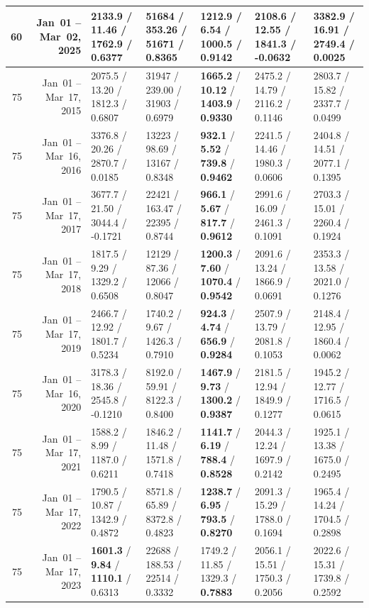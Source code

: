 \begin{longtable}{r r l l l l l}
60 & Jan~01 -- Mar~02, 2025 & 2133.9 / 11.46 / 1762.9 / 0.6377 & 51684 / 353.26 / 51671 / 0.8365 & \textbf{1212.9} / \textbf{6.54} / \textbf{1000.5} / \textbf{0.9142} & 2108.6 / 12.55 / 1841.3 / -0.0632 & 3382.9 / 16.91 / 2749.4 / 0.0025 \\
\midrule
75 & Jan~01 -- Mar~17, 2015 & 2075.5 / 13.20 / 1812.3 / 0.6807 & 31947 / 239.00 / 31903 / 0.6979 & \textbf{1665.2} / \textbf{10.12} / \textbf{1403.9} / \textbf{0.9330} & 2475.2 / 14.79 / 2116.2 / 0.1146 & 2803.7 / 15.82 / 2337.7 / 0.0499 \\
75 & Jan~01 -- Mar~16, 2016 & 3376.8 / 20.26 / 2870.7 / 0.0185 & 13223 / 98.69 / 13167 / 0.8348 & \textbf{932.1} / \textbf{5.52} / \textbf{739.8} / \textbf{0.9462} & 2241.5 / 14.46 / 1980.3 / 0.0606 & 2404.8 / 14.51 / 2077.1 / 0.1395 \\
75 & Jan~01 -- Mar~17, 2017 & 3677.7 / 21.50 / 3044.4 / -0.1721 & 22421 / 163.47 / 22395 / 0.8744 & \textbf{966.1} / \textbf{5.67} / \textbf{817.7} / \textbf{0.9612} & 2991.6 / 16.09 / 2461.3 / 0.1091 & 2703.3 / 15.01 / 2260.4 / 0.1924 \\
75 & Jan~01 -- Mar~17, 2018 & 1817.5 / 9.29 / 1329.2 / 0.6508 & 12129 / 87.36 / 12066 / 0.8047 & \textbf{1200.3} / \textbf{7.60} / \textbf{1070.4} / \textbf{0.9542} & 2091.6 / 13.24 / 1866.9 / 0.0691 & 2353.3 / 13.58 / 2021.0 / 0.1276 \\
75 & Jan~01 -- Mar~17, 2019 & 2466.7 / 12.92 / 1801.7 / 0.5234 & 1740.2 / 9.67 / 1426.3 / 0.7910 & \textbf{924.3} / \textbf{4.74} / \textbf{656.9} / \textbf{0.9284} & 2507.9 / 13.79 / 2081.8 / 0.1053 & 2148.4 / 12.95 / 1860.4 / 0.0062 \\
75 & Jan~01 -- Mar~16, 2020 & 3178.3 / 18.36 / 2545.8 / -0.1210 & 8192.0 / 59.91 / 8122.3 / 0.8400 & \textbf{1467.9} / \textbf{9.73} / \textbf{1300.2} / \textbf{0.9387} & 2181.5 / 12.94 / 1849.9 / 0.1277 & 1945.2 / 12.77 / 1716.5 / 0.0615 \\
75 & Jan~01 -- Mar~17, 2021 & 1588.2 / 8.99 / 1187.0 / 0.6211 & 1846.2 / 11.48 / 1571.8 / 0.7418 & \textbf{1141.7} / \textbf{6.19} / \textbf{788.4} / \textbf{0.8528} & 2044.3 / 12.24 / 1697.9 / 0.2142 & 1925.1 / 13.38 / 1675.0 / 0.2495 \\
75 & Jan~01 -- Mar~17, 2022 & 1790.5 / 10.87 / 1342.9 / 0.4872 & 8571.8 / 65.89 / 8372.8 / 0.4823 & \textbf{1238.7} / \textbf{6.95} / \textbf{793.5} / \textbf{0.8270} & 2091.3 / 15.29 / 1788.0 / 0.1694 & 1965.4 / 14.24 / 1704.5 / 0.2898 \\
75 & Jan~01 -- Mar~17, 2023 & \textbf{1601.3} / \textbf{9.84} / \textbf{1110.1} / 0.6313 & 22688 / 188.53 / 22514 / 0.3332 & 1749.2 / 11.85 / 1329.3 / \textbf{0.7883} & 2056.1 / 15.51 / 1750.3 / 0.2056 & 2022.6 / 15.31 / 1739.8 / 0.2592 \\

\end{longtable}
